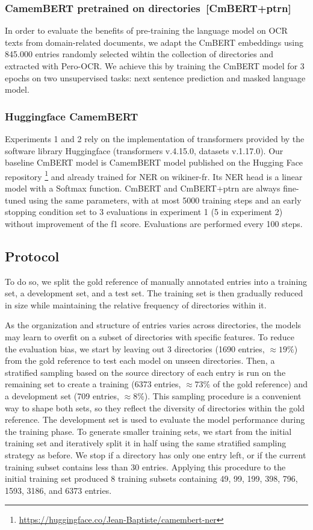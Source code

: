\subsubsection{CamemBERT pretrained on directories~[CmBERT+ptrn]}
In order to evaluate the benefits of pre-training the language model on OCR texts from domain-related documents, we adapt the CmBERT embeddings using \num{845.000} entries randomly selected wihtin the collection of directories and extracted with Pero-OCR.
We achieve this by training the CmBERT model for 3 epochs on two unsupervised tasks: next sentence prediction and masked language model.


\subsubsection{Huggingface CamemBERT}
\label{sub:ner-xp1-sysytems-huggingcam}
Experiments 1 and 2 rely on the implementation of transformers provided by the software library Huggingface (transformers v.4.15.0, datasets v.1.17.0).
Our baseline CmBERT model is CamemBERT model published on the Hugging Face repository \footnote{\url{https://huggingface.co/Jean-Baptiste/camembert-ner}} and already trained for NER on wikiner-fr.
Its NER head is a linear model with a Softmax function.
CmBERT and CmBERT+ptrn are always fine-tuned using the same parameters, with at most 5000 training steps and an early stopping condition set to 3 evaluations in experiment 1 (5 in experiment 2) without improvement of the f1 score. Evaluations are performed every 100 steps.


\subsection{Protocol}
To do so, we split the gold reference of manually annotated entries into a training set, a development set, and a test set. 
The training set is then gradually reduced in size while maintaining the relative frequency of directories within it.

As the organization and structure of entries varies across directories, the models may learn to overfit on a subset of directories with specific features.
To reduce the evaluation bias, we start by leaving out 3 directories (1690 entries, $\approx 19\%$) from the gold reference to test each model on unseen directories.
Then, a stratified sampling based on the source directory of each entry is run on the remaining set to create a training (6373 entries, $\approx 73\%$ of the gold reference) and a development set (709 entries, $\approx 8\%$).
This sampling procedure is a convenient way to shape both sets, so they reflect the diversity of directories within the gold reference.
The development set is used to evaluate the model performance during the training phase.
To generate smaller training sets, we start from the initial training set and iteratively split it in half using the same stratified sampling strategy as before.
We stop if a directory has only one entry left, or if the current training subset contains less than 30 entries.
Applying this procedure to the initial training set produced 8 training subsets containing 49, 99, 199, 398, 796, 1593, 3186, and 6373 entries.


